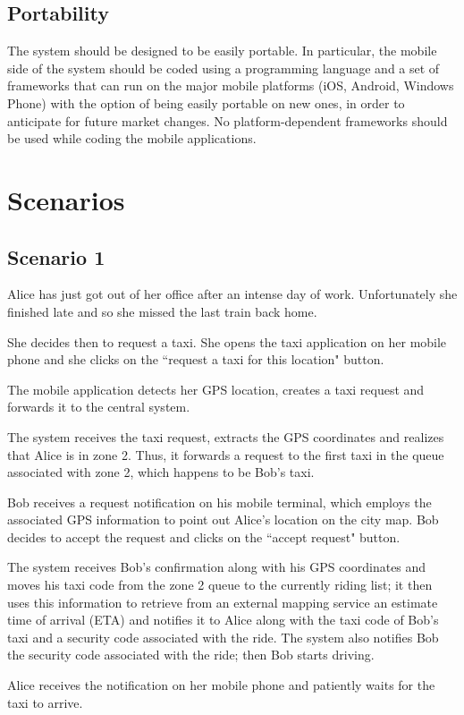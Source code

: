 \subsection{Portability}
The system should be designed to be easily portable. In particular, the mobile side of the system should be coded using a programming language and a set of frameworks that can run on the major mobile platforms (iOS, Android, Windows Phone) with the option of being easily portable on new ones, in order to anticipate for future market changes. No platform-dependent frameworks should be used while coding the mobile applications.


\section{Scenarios}
\subsection{Scenario 1}
Alice has just got out of her office after an intense day of work. Unfortunately she finished late and so she missed the last train back home.

She decides then to request a taxi. She opens the taxi application on her mobile phone and she clicks on the ``request a taxi for this location" button.

The mobile application detects her GPS location, creates a taxi request and forwards it to the central system.

The system receives the taxi request, extracts the GPS coordinates and realizes that Alice is in zone 2. Thus, it forwards a request to the first taxi in the queue associated with zone 2, which happens to be Bob's taxi.

Bob receives a request notification on his mobile terminal, which employs the associated GPS information to point out Alice's location on the city map. Bob decides to accept the request and clicks on the ``accept request" button.

The system receives Bob's confirmation along with his GPS coordinates and moves his taxi code from the zone 2 queue to the currently riding list; it then uses this information to retrieve from an external mapping service an estimate time of arrival (ETA) and notifies it to Alice along with the taxi code of Bob's taxi and a security code associated with the ride. The system also notifies Bob the security code associated with the ride; then Bob starts driving.

Alice receives the notification on her mobile phone and patiently waits for the taxi to arrive.

